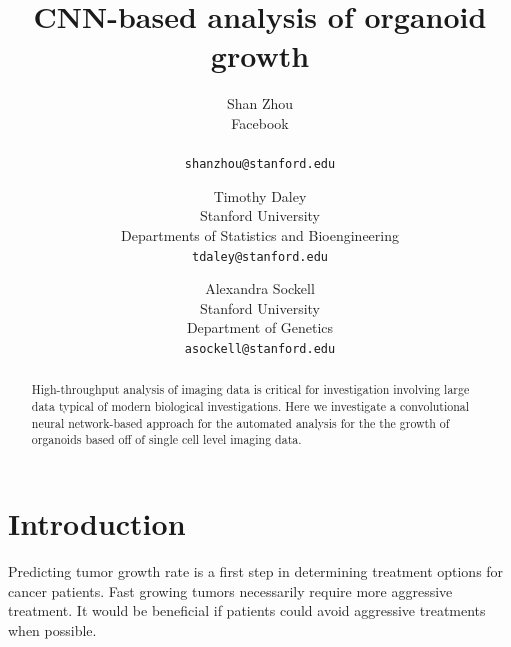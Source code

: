\documentclass[10pt,twocolumn,letterpaper]{article}
\begin{document}
\title{CNN-based analysis of organoid growth}

\author{Shan Zhou \\
Facebook \\
\\
{\tt\small shanzhou@stanford.edu}
\and
Timothy Daley \\
Stanford University \\
Departments of Statistics and Bioengineering \\
{\tt\small tdaley@stanford.edu}
\and
Alexandra Sockell \\
Stanford University \\
Department of Genetics \\
{\tt\small asockell@stanford.edu}
}


\maketitle

\begin{abstract}
   High-throughput analysis of imaging data is critical for investigation involving large data typical of modern biological investigations.  Here we investigate a convolutional neural network-based approach for the automated analysis for the the growth of organoids based off of single cell level imaging data.  
\end{abstract}

\section{Introduction}

Predicting tumor growth rate is a first step in determining treatment options for cancer patients.  Fast growing tumors necessarily require more aggressive treatment.  It would be beneficial if patients could avoid aggressive treatments when possible.  
\end{document}
